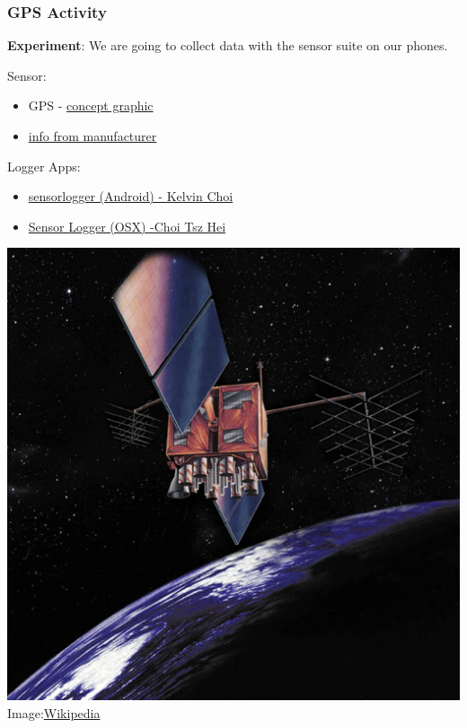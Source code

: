 \documentclass[fleqn]{beamer} %
\newcommand{\sectionIsubsectionIVtitle}{GPS Activity}
\begin{document}
			\begin{frame}
				\frametitle{\sectionIsubsectionIVtitle}

				\scriptsize
				{\bf Experiment}: We are going to collect data with the sensor suite on our phones. \vspc
				
				\begin{multicols}{2}
				    Sensor:
				    \begin{itemize}
				    	\item GPS - \href{https://en.wikipedia.org/wiki/File:ConstellationGPS.gif}{concept graphic} 
				    	\item \href{https://www.garmin.com/en-US/aboutgps/}{info from manufacturer}  
				    \end{itemize}

				    Logger Apps:
					\begin{itemize}
						\item \href{https://www.tszheichoi.com/sensorlogger}{sensorlogger (Android) - Kelvin Choi} \vspc
						\item \href{https://apps.apple.com/us/app/sensor-logger/id1531582925}{Sensor Logger (OSX) -Choi Tsz Hei}
					\end{itemize}

					\includegraphics[scale=.075,angle=-90,origin=c]{images/GPS-IIR.jpeg}
					{\tiny Image:\href{https://en.wikipedia.org/wiki/Global_Positioning_System}{Wikipedia}}
				\end{multicols}	
				
			\end{frame}
\end{document}
